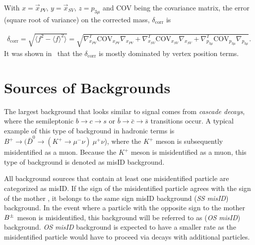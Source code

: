With $x=\vec{{x}}_{PV}$, $y=\vec{{x}}_{SV}$, $z=p_{3\mu}$ and \rm{COV} being the covariance matrix, the error (square root of variance) on the corrected mass, $\delta_\mathrm{{corr}}$ is
%
%


\begin{equation}
\begin{aligned}
	\delta_\mathrm{{corr}} = \sqrt{ \langle f^{2}-\langle f \rangle^{2} \rangle} = \sqrt{\nabla^{T}_{x_{PV}} {\mathrm{COV}}_{x_{PV}} \nabla_{x_{PV}} + \nabla^{T}_{x_{SV}} {\mathrm{COV}}_{x_{SV}} \nabla_{x_{SV}} + \nabla^{T}_{p_{3\mu}} {\mathrm{COV}}_{p_{3\mu}} \nabla_{p_{3\mu}}}. 
\end{aligned}
\end{equation}
It was shown in~\cite{Egede:1694339} that the $\delta_\mathrm{{corr}}$ is mostly dominated by vertex position terms.

\section{Sources of Backgrounds}
\label{bkgquick}
The largest background that looks similar to signal comes from \textit{cascade decays}, where the semileptonic $b \rightarrow c \rightarrow s$ or $\bar{b} \rightarrow \bar{c} \rightarrow \bar{s}$ transitions occur. A typical example of this type of background in hadronic terms is $B^{+} \rightarrow (\bar{D}^{0} \rightarrow (K^{+} \rightarrow \mu^{-} \nu)\ \mu^{+} \nu$), where the $K^{+}$ meson is subsequently misidentified as a muon. Because the $K^{+}$ meson is misidentified as a muon, this type of background is denoted as misID background.

All background sources that contain at least one misidentified particle are categorized as misID. If the sign of the misidentified particle agrees with the sign of the mother \Bpm, it belongs to the same sign misID background (\textit{SS misID}) background. In the event where a particle with the opposite sign to the mother ${{B}^\pm}$ meson is misidentified, this background will be referred to as (\textit{OS misID}) background. \textit{OS misID} background is expected to have a smaller rate as the misidentified particle would have to proceed via decays with additional particles.

